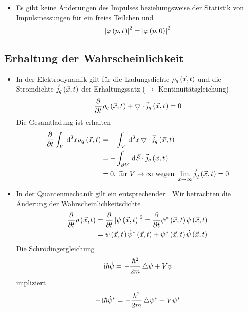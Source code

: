 \begin{figure}
	\centering
	
\end{figure}
\begin{itemize}
	\item Es gibt keine Änderungen des Impulses beziehungsweise der Statistik von Impulsmessungen für ein freies Teilchen und
	\begin{equation}
		\Norm{\varphi\of{p,t}}^2 = \Norm{\varphi\of{p,0}}^2
	\end{equation}
\end{itemize}

\subsection{Erhaltung der Wahrscheinlichkeit}
\begin{itemize}
	\item In der Elektrodynamik gilt für die Ladungsdichte $\rho_q\of{\vX,t}$ und die Stromdichte $\vJ_q\of{\vX,t}$ der Erhaltungssatz ($\rightarrow$ Kontinuitätsgleichung)
	\begin{equation}
		\ppv{}{t} \rho_q\of{\vX,t} + \Nabla \cdot \vJ_q\of{\vX,t} = 0
	\end{equation}
	Die Gesamtladung ist erhalten
	\begin{align}
		\ppv{}{t}\int\nolimits_V \dn{x}{3} \rho_q\of{\vX,t} & = - \int\nolimits_V \dn{x}{3} \Nabla\cdot\vJ_q\of{\vX,t} \\
		& = - \int\nolimits_{\partial V} \dd{\vS}\cdot\vJ_q\of{\vX,t} \\
		& = 0 \text{, für } V\to\infty \text{ wegen } \lim\limits_{x\to \infty} \vJ_q\of{\vX,t} = 0
	\end{align}
	\item In der Quantenmechanik gilt ein entsprechender . Wir betrachten die Änderung der Wahrscheinlichkeitsdichte
	\begin{align}
		\ppv{}{t} \rho\of{\vX,t} & = \ppv{}{t} \Norm{\psi\of{\vX,t}}^2 = \ppv{}{t} \psi^*\of{\vX,t}\psi\of{\vX,t} \\
		& = \psi\of{\vX,t}\dot{\psi}^*\of{\vX,t} + \psi^*\of{\vX,t}\dot{\psi}\of{\vX,t}
	\end{align}
	Die Schrödingergleichung
	\begin{equation}
		\mI \hbar \dot{\psi} = - \frac{\hbar^2}{2 m} \Laplace \psi + V\psi
	\end{equation}
	impliziert
	\begin{equation}
		-\mI\hbar\dot{\psi}^* = - \frac{\hbar^2}{2m}\Laplace\psi^* + V\psi^*

\end{equation}
\end{itemize}
